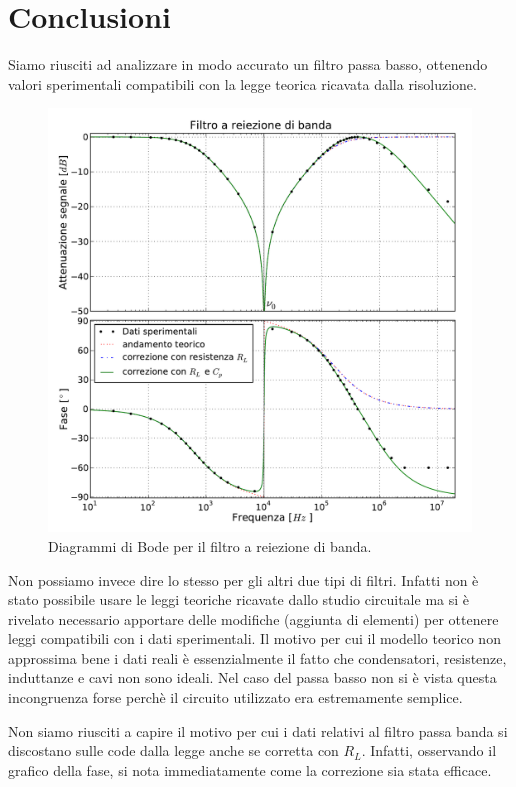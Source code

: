 \section{Conclusioni}

Siamo riusciti ad analizzare in modo accurato un filtro passa basso, ottenendo valori sperimentali compatibili con la legge teorica ricavata dalla risoluzione.

\begin{figure}
    \includegraphics[width=120mm]{notch.pdf}
    \caption{Diagrammi di Bode per il filtro a reiezione di banda.}
    \label{fig:notch}
\end{figure}

Non possiamo invece dire lo stesso per gli altri due tipi di filtri. Infatti non è stato possibile usare le leggi teoriche ricavate dallo studio circuitale ma si è rivelato necessario apportare delle modifiche (aggiunta di elementi) per ottenere leggi compatibili con i dati sperimentali. Il motivo per cui il modello teorico non approssima bene i dati reali è essenzialmente il fatto che condensatori, resistenze, induttanze e cavi non sono ideali. Nel caso del passa basso non si è vista questa incongruenza forse perchè il circuito utilizzato era estremamente semplice. 

Non siamo riusciti a capire il motivo per cui i dati relativi al filtro passa banda si discostano sulle code dalla legge anche se corretta con $R_L$. Infatti, osservando il grafico della fase, si nota immediatamente come la correzione sia stata efficace.

